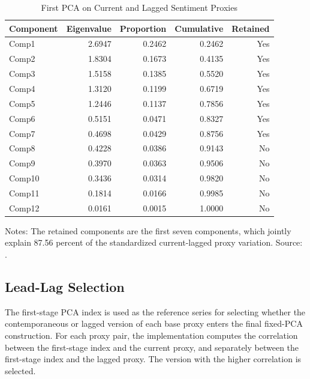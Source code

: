\documentclass[12pt]{article}
\begin{document}
\begin{table}[htbp]
\centering
\caption{First PCA on Current and Lagged Sentiment Proxies}
\label{tab:stage1_pca}
\begin{tabular}{lrrrr}
\toprule
Component & Eigenvalue & Proportion & Cumulative & Retained \\
\midrule
Comp1 & 2.6947 & 0.2462 & 0.2462 & Yes \\
Comp2 & 1.8304 & 0.1673 & 0.4135 & Yes \\
Comp3 & 1.5158 & 0.1385 & 0.5520 & Yes \\
Comp4 & 1.3120 & 0.1199 & 0.6719 & Yes \\
Comp5 & 1.2446 & 0.1137 & 0.7856 & Yes \\
Comp6 & 0.5151 & 0.0471 & 0.8327 & Yes \\
Comp7 & 0.4698 & 0.0429 & 0.8756 & Yes \\
Comp8 & 0.4228 & 0.0386 & 0.9143 & No \\
Comp9 & 0.3970 & 0.0363 & 0.9506 & No \\
Comp10 & 0.3436 & 0.0314 & 0.9820 & No \\
Comp11 & 0.1814 & 0.0166 & 0.9985 & No \\
Comp12 & 0.0161 & 0.0015 & 1.0000 & No \\
\bottomrule
\end{tabular}
\begin{minipage}{0.95\textwidth}
\footnotesize
Notes: The retained components are the first seven components, which jointly explain 87.56 percent of the standardized current-lagged proxy variation. Source: .
\end{minipage}
\end{table}

\subsection{Lead-Lag Selection}

The first-stage PCA index is used as the reference series for selecting whether the contemporaneous or lagged version of each base proxy enters the final fixed-PCA construction. For each proxy pair, the implementation computes the correlation between the first-stage index and the current proxy, and separately between the first-stage index and the lagged proxy. The version with the higher correlation is selected.
\end{document}
